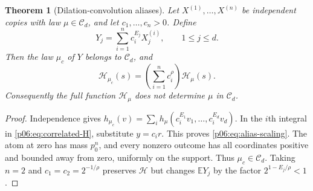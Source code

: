 \documentclass[11pt,letterpaper]{article}
\newtheorem{theorem}{Theorem}[section]
\theoremstyle{definition}
\theoremstyle{remark}
\newcommand{\1}{\mathbf 1}
\begin{document}
\begin{theorem}[Dilation-convolution aliases]\label{p06:thm:correlated-alias}
Let $X^{(1)},\ldots,X^{(n)}$ be independent copies with law
$\mu\in\mathcal C_d$, and let $c_1,\ldots,c_n>0$. Define
\[
 Y_j=\sum_{i=1}^n c_i^{E_j}X_j^{(i)},\qquad 1\le j\le d.
\]
Then the law $\mu_c$ of $Y$ belongs to $\mathcal C_d$, and
\begin{equation}\label{p06:eq:alias-scaling}
 \mathcal H_{\mu_c}(s)=
 \left(\sum_{i=1}^n c_i^\rho\right)\mathcal H_\mu(s).
\end{equation}
Consequently the full function $\mathcal H_\mu$ does not determine
$\mu$ in $\mathcal C_d$.
\end{theorem}
\begin{proof}
Independence gives
$h_{\mu_c}(v)=\sum_i h_\mu(c_i^{E_1}v_1,\ldots,c_i^{E_d}v_d)$.
In the $i$th integral in \eqref{p06:eq:correlated-H}, substitute $y=c_i r$.
This proves \eqref{p06:eq:alias-scaling}. The atom at zero has mass $p_0^n$,
and every nonzero outcome has all coordinates positive and bounded away
from zero, uniformly on the support. Thus $\mu_c\in\mathcal C_d$.
Taking $n=2$ and $c_1=c_2=2^{-1/\rho}$ preserves $\mathcal H$ but changes
$\mathbb E Y_j$ by the factor $2^{1-E_j/\rho}<1$.
\end{proof}
\end{document}
